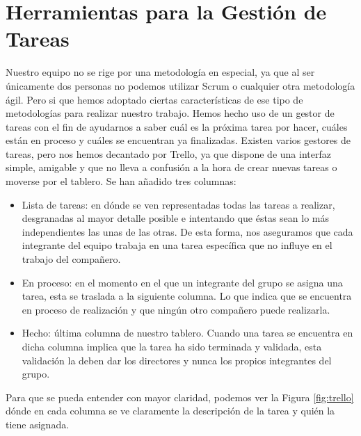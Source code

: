 \section{Herramientas para la Gestión de Tareas}
\label{cap:sec:herramientasGestionTareas}
Nuestro equipo no se rige por una metodología en especial, ya que al ser únicamente dos personas no podemos utilizar Scrum o cualquier otra metodología ágil. Pero si que hemos adoptado ciertas características de ese tipo de metodologías para realizar nuestro trabajo.
Hemos hecho uso de un gestor de tareas con el fin de ayudarnos a saber cuál es la próxima tarea por hacer, cuáles están en proceso y cuáles se encuentran ya finalizadas. Existen varios gestores de tareas, pero nos hemos decantado por Trello, ya que dispone de una interfaz simple, amigable y que no lleva a confusión a la hora de crear nuevas tareas o moverse por el tablero.
Se han añadido tres columnas:
\begin{itemize}
	\item Lista de tareas: en dónde se ven representadas todas las tareas a realizar, desgranadas al mayor detalle posible e intentando que éstas sean lo más independientes las unas de las otras. De esta forma, nos aseguramos que cada integrante del equipo trabaja en una tarea específica que no influye en el trabajo del compañero.
	\item En proceso: en el momento en el que un integrante del grupo se asigna una tarea, esta se traslada a la siguiente columna. Lo que indica que se encuentra en proceso de realización y que ningún otro compañero puede realizarla. 
	\item Hecho: última columna de nuestro tablero. Cuando una tarea se encuentra en dicha columna implica que la tarea ha sido terminada y validada, esta validación la deben dar los directores y nunca los propios integrantes del grupo.
	
\end{itemize}

Para que se pueda entender con mayor claridad, podemos ver la Figura \ref{fig:trello} dónde en cada columna se ve claramente la descripción de la tarea y quién la tiene asignada.

